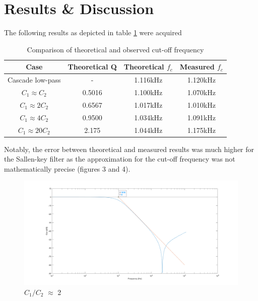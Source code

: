 \documentclass{scrartcl}
\begin{document}
\section{Results \& Discussion}
The following results as depicted in table \ref{label} were acquired
\begin{table}[H]
    \centering
    \begin{tabular}{|c|c|c|c|} \hline
        \textbf{Case} & \textbf{Theoretical Q} & \textbf{Theoretical $f_c$}  & \textbf{Measured $f_c$} \\ \hline
        Cascade low-pass &  - & 1.116kHz & 1.120kHz \\ \hline 
        $C_1\approx C_2$ & 0.5016 & 1.100kHz  & 1.070kHz\\ \hline
        $C_1\approx 2C_2$ & 0.6567 & 1.017kHz  & 1.010kHz\\ \hline
        $C_1\approx 4C_2$ & 0.9500 & 1.034kHz  & 1.091kHz\\ \hline
        $C_1\approx 20C_2$ & 2.175 & 1.044kHz  & 1.175kHz \\ \hline
    \end{tabular}
    \caption{Comparison of theoretical and observed cut-off frequency}
    \label{label}
\end{table}

Notably, the error between theoretical and measured results was much higher for the Sallen-key filter as the approximation for the cut-off frequency was not mathematically precise (figures 3 and 4).

\begin{figure}[h!]
    \centering
    \includegraphics[width=14cm]{2ratio2.png}
    \caption{$C_1/C_2$ $\approx$ 2}
    \label{fig:my_label}
\end{figure}
\end{document}
